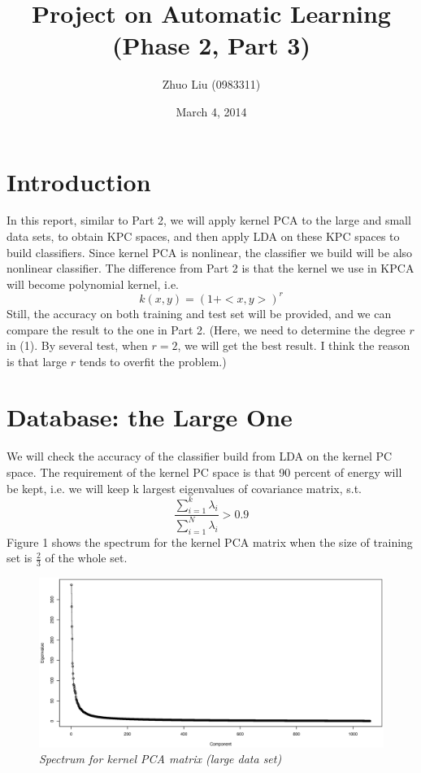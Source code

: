 \documentclass{article}
\author{Zhuo Liu (0983311)}
\title{Project on Automatic Learning (Phase 2, Part 3)}
\date{March 4, 2014}
\begin{document}
\maketitle


\section{Introduction}

In this report, similar to Part 2, we will apply kernel PCA to the large and small data
sets, to obtain KPC spaces, and then apply LDA on these KPC spaces to build classifiers. Since kernel PCA is nonlinear, the
classifier we build will be also nonlinear classifier. The difference from Part 2 is that the kernel we use in KPCA will become polynomial kernel, i.e.
\begin{equation}
 k(x,y) = (1+<x,y>)^{r}
\end{equation}
Still, the accuracy on both training and test set will be provided, and we can compare the result to the one in Part 2. (Here, we need to determine
the degree $r$ in (1). By several test, when $r=2$, we will get the best result. I think the reason is that large $r$ tends to overfit the problem.) 

\goodbreak

\section{Database: the Large One}

We will check the accuracy of the classifier build from LDA on the kernel PC space. The requirement of the kernel PC space is that 
90 percent of energy will be kept, i.e. we will keep k largest eigenvalues of covariance matrix, s.t.
\begin{equation}
 \frac{\sum_{i=1}^{k}\lambda_{i}}{\sum_{i=1}^{N}\lambda_{i}} > 0.9
\end{equation}
Figure 1 shows the spectrum for the kernel PCA matrix when the size of training set is $\frac{2}{3}$ of the whole set.

\begin{figure}[htp]
\centering
\includegraphics[width=12.1cm]{large_kpca_spectrum_poly.eps}
\caption{\textit{Spectrum for kernel PCA matrix (large data set)}}
\end{figure}
\end{document}
